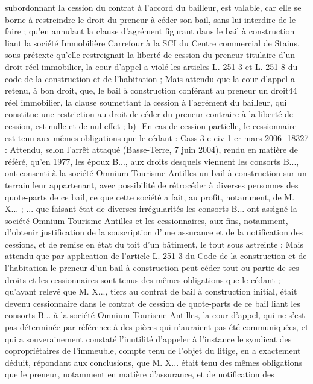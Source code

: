 \documentclass[11pt,a4paper]{report}
\begin{document}
	subordonnant la cession du contrat à l'accord du bailleur, est valable, car elle se borne à restreindre le droit du
	preneur à céder son bail, sans lui interdire de le faire ; qu'en annulant la clause d'agrément figurant dans le bail
	à construction liant la société Immobilière Carrefour à la SCI du Centre commercial de Stains, sous prétexte
	qu'elle restreignait la liberté de cession du preneur titulaire d'un droit réel immobilier, la cour d'appel a violé
	les articles L. 251-3 et L. 251-8 du code de la construction et de l'habitation ;
	Mais attendu que la cour d'appel a retenu, à bon droit, que, le bail à construction conférant au preneur un droit44
	réel immobilier, la clause soumettant la cession à l'agrément du bailleur, qui constitue une restriction au droit
	de céder du preneur contraire à la liberté de cession, est nulle et de nul effet ;
	b)- En cas de cession partielle, le cessionnaire est tenu aux mêmes obligations que le cédant :
	Cass 3 e civ 1 er mars 2006 -18327 : Attendu, selon l'arrêt attaqué (Basse-Terre, 7 juin 2004), rendu en
	matière de référé, qu'en 1977, les époux B..., aux droits desquels viennent les consorts B..., ont consenti à la
	société Omnium Tourisme Antilles un bail à construction sur un terrain leur appartenant, avec possibilité de
	rétrocéder à diverses personnes des quote-parts de ce bail, ce que cette société a fait, au profit, notamment, de
	M. X... ; ...
	que faisant état de diverses irrégularités les consorts B... ont assigné la société Omnium Tourisme Antilles et les
	cessionnaires, aux fins, notamment, d'obtenir justification de la souscription d'une assurance et de la notification
	des cessions, et de remise en état du toit d'un bâtiment, le tout sous astreinte ;
	Mais attendu que par application de l'article L. 251-3 du Code de la construction et de l'habitation le preneur
	d'un bail à construction peut céder tout ou partie de ses droits et les cessionnaires sont tenus des mêmes
	obligations que le cédant ; qu'ayant relevé que M. X..., tiers au contrat de bail à construction initial, était devenu
	cessionnaire dans le contrat de cession de quote-parts de ce bail liant les consorts B... à la société Omnium
	Tourisme Antilles, la cour d'appel, qui ne s'est pas déterminée par référence à des pièces qui n'auraient pas été
	communiquées, et qui a souverainement constaté l'inutilité d'appeler à l'instance le syndicat des copropriétaires
	de l'immeuble, compte tenu de l'objet du litige, en a exactement déduit, répondant aux conclusions, que M. X...
	était tenu des mêmes obligations que le preneur, notamment en matière d'assurance, et de notification des
\end{document}

